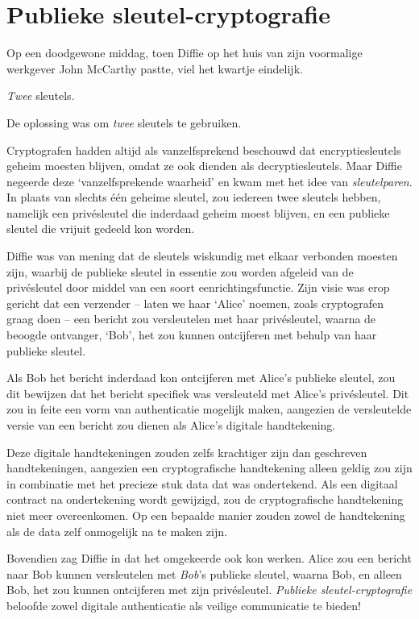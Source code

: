 \documentclass[
  a5paper,
  smalldemyvopaper,11pt,twoside,onecolumn,openright,extrafontsizes]{memoir}
\begin{document}
\section{Publieke
sleutel-cryptografie}\label{publieke-sleutel-cryptografie}

Op een doodgewone middag, toen Diffie op het huis van zijn voormalige
werkgever John McCarthy pastte, viel het kwartje eindelijk.

\emph{Twee} sleutels.

De oplossing was om \emph{twee} sleutels te gebruiken.

Cryptografen hadden altijd als vanzelfsprekend beschouwd dat
encryptiesleutels geheim moesten blijven, omdat ze ook dienden als
decryptiesleutels. Maar Diffie negeerde deze `vanzelfsprekende waarheid'
en kwam met het idee van \emph{sleutelparen}. In plaats van slechts één
geheime sleutel, zou iedereen twee sleutels hebben, namelijk een
privésleutel die inderdaad geheim moest blijven, en een publieke sleutel
die vrijuit gedeeld kon worden.

Diffie was van mening dat de sleutels wiskundig met elkaar verbonden
moesten zijn, waarbij de publieke sleutel in essentie zou worden
afgeleid van de privésleutel door middel van een soort
eenrichtingsfunctie. Zijn visie was erop gericht dat een verzender --
laten we haar `Alice' noemen, zoals cryptografen graag doen -- een
bericht zou versleutelen met haar privésleutel, waarna de beoogde
ontvanger, `Bob', het zou kunnen ontcijferen met behulp van haar
publieke sleutel.

Als Bob het bericht inderdaad kon ontcijferen met Alice's publieke
sleutel, zou dit bewijzen dat het bericht specifiek was versleuteld met
Alice's privésleutel. Dit zou in feite een vorm van authenticatie
mogelijk maken, aangezien de versleutelde versie van een bericht zou
dienen als Alice's digitale handtekening.

Deze digitale handtekeningen zouden zelfs krachtiger zijn dan geschreven
handtekeningen, aangezien een cryptografische handtekening alleen geldig
zou zijn in combinatie met het precieze stuk data dat was ondertekend.
Als een digitaal contract na ondertekening wordt gewijzigd, zou de
cryptografische handtekening niet meer overeenkomen. Op een bepaalde
manier zouden zowel de handtekening als de data zelf onmogelijk na te
maken zijn.

Bovendien zag Diffie in dat het omgekeerde ook kon werken. Alice zou een
bericht naar Bob kunnen versleutelen met \emph{Bob}'s publieke sleutel,
waarna Bob, en alleen Bob, het zou kunnen ontcijferen met zijn
privésleutel. \emph{Publieke sleutel-cryptografie} beloofde zowel
digitale authenticatie als veilige communicatie te bieden!
\end{document}
